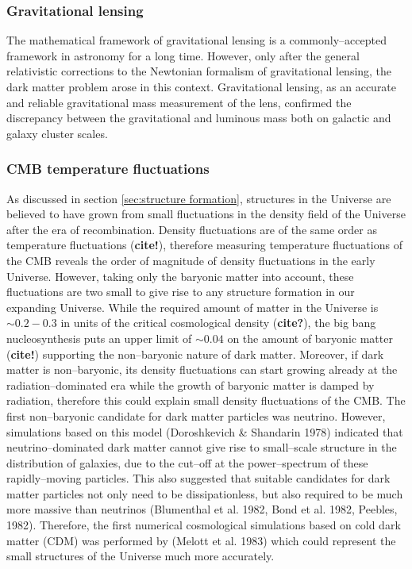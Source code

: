\documentclass[paper=a4, fontsize=11pt]{scrartcl} %
\numberwithin{equation}{section} %
\numberwithin{figure}{section} %
\numberwithin{table}{section} %
\newcommand{\ignore}[1]{}
\begin{document}
\subsubsection{Gravitational lensing}
The mathematical framework of gravitational lensing is a commonly--accepted framework in astronomy for a long time. However, only after the general relativistic corrections to the Newtonian formalism of gravitational lensing, the dark matter problem arose in this context. Gravitational lensing, as an accurate and reliable gravitational mass measurement of the lens, confirmed the discrepancy between the gravitational and luminous mass both on galactic and galaxy cluster scales.

\subsubsection{CMB temperature fluctuations}
As discussed in section \ref{sec:structure formation}, structures in the Universe are believed to have grown from small fluctuations in the density field of the Universe after the era of recombination. Density fluctuations are of the same order as temperature fluctuations ({\bf cite!})\ignore{\bf why? look back in the structure formation part!}, therefore measuring temperature fluctuations of the CMB reveals the order of magnitude of density fluctuations in the early Universe. However, taking only the baryonic matter into account, these fluctuations are two small to give rise to any structure formation in our expanding Universe. While the required amount of matter in the Universe is $\sim 0.2 - 0.3$ in units of the critical cosmological density ({\bf cite?}), the big bang nucleosynthesis puts an upper limit of $\sim 0.04$ on the amount of baryonic matter ({\bf cite!}) supporting the non--baryonic nature of dark matter. Moreover, if dark matter is non--baryonic, its density fluctuations can start growing already at the radiation--dominated era while the growth of baryonic matter is damped by radiation, therefore this could explain small density fluctuations of the CMB.
The first non--baryonic candidate for dark matter particles was neutrino. However, simulations based on this model (Doroshkevich \& Shandarin 1978) indicated that neutrino--dominated dark matter cannot give rise to small--scale structure in the distribution of galaxies, due to the cut--off at the power--spectrum of these rapidly--moving particles. This also suggested that suitable candidates for dark matter particles not only need to be dissipationless, but also required to be much more massive than neutrinos (Blumenthal et al. 1982, Bond et al. 1982, Peebles, 1982). Therefore, the first numerical cosmological simulations based on cold dark matter (CDM) was performed by (Melott et al. 1983) which could represent the small structures of the Universe much more accurately.
\end{document}
